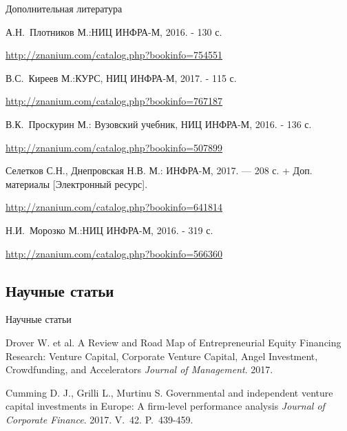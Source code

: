 \documentclass[_Venture_p1.tex]{subfiles}
\begin{document}
\begin{frame}[ allowframebreaks]{Дополнительная литература}
  \begin{thebibliography}{10}
    
  \beamertemplatebookbibitems

А.Н.~Плотников
М.:НИЦ ИНФРА-М, 2016. - 130 с.

\footnotesize{\url{http://znanium.com/catalog.php?bookinfo=754551}} 

В.С.~Киреев 
М.:КУРС, НИЦ ИНФРА-М, 2017. - 115 с.

\footnotesize{\url{http://znanium.com/catalog.php?bookinfo=767187}}

\pagebreak

В.К.~Проскурин
М.: Вузовский учебник, НИЦ ИНФРА-М, 2016. - 136 с.

\footnotesize{\url{http://znanium.com/catalog.php?bookinfo=507899}}


Селетков С.Н., Днепровская Н.В. 
М.: ИНФРА-М, 2017. — 208 с. + Доп. материалы [Электронный ресурс]. 

\footnotesize{\url{http://znanium.com/catalog.php?bookinfo=641814}} 

\pagebreak

Н.И.~Морозко 
М.:НИЦ ИНФРА-М, 2016. - 319 с.

\footnotesize{\url{http://znanium.com/catalog.php?bookinfo=566360}}

  \end{thebibliography}
\end{frame}

\subsection*{Научные статьи}

\begin{frame}{Научные статьи}
  \begin{thebibliography}{10}
  \beamertemplatearticlebibitems
	\newblock Drover W. et al. 
	\newblock A Review and Road Map of Entrepreneurial Equity Financing Research: Venture Capital, Corporate Venture Capital, Angel Investment, Crowdfunding, and Accelerators {\em Journal of Management}. 2017. 
	
	\newblock Cumming D. J., Grilli L., Murtinu S. 
	\newblock Governmental and independent venture capital investments in Europe: A firm-level performance analysis {\em Journal of Corporate Finance}. 2017. V.~42. P.~439-459.
  \end{thebibliography}
\end{frame}
\end{document}
